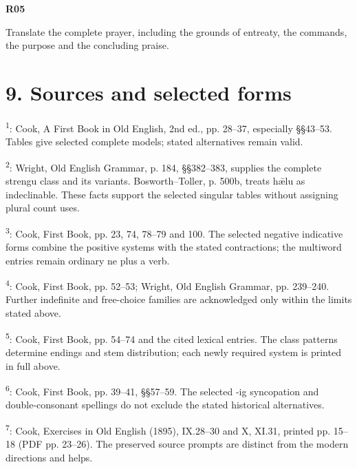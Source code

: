 \par\begin{minipage}{\linewidth}\raggedright
\textbf{R05}

Translate the complete prayer, including the grounds of entreaty, the commands, the purpose and the concluding praise.

\end{minipage}\par\addvspace{4pt}

\section*{9. Sources and selected forms}

\begingroup\fontsize{10}{12.8}\selectfont
\setlength{\parskip}{1.5pt}
\textsuperscript{1}: Cook, A First Book in Old English, 2nd ed., pp. 28–37, especially §§43–53. Tables give selected complete models; stated alternatives remain valid.

\textsuperscript{2}: Wright, Old English Grammar, p. 184, §§382–383, supplies the complete strengu class and its variants. Bosworth–Toller, p. 500b, treats hǣlu as indeclinable. These facts support the selected singular tables without assigning plural count uses.

\textsuperscript{3}: Cook, First Book, pp. 23, 74, 78–79 and 100. The selected negative indicative forms combine the positive systems with the stated contractions; the multiword entries remain ordinary ne plus a verb.

\textsuperscript{4}: Cook, First Book, pp. 52–53; Wright, Old English Grammar, pp. 239–240. Further indefinite and free-choice families are acknowledged only within the limits stated above.

\textsuperscript{5}: Cook, First Book, pp. 54–74 and the cited lexical entries. The class patterns determine endings and stem distribution; each newly required system is printed in full above.

\textsuperscript{6}: Cook, First Book, pp. 39–41, §§57–59. The selected -ig syncopation and double-consonant spellings do not exclude the stated historical alternatives.

\textsuperscript{7}: Cook, Exercises in Old English (1895), IX.28–30 and X, XI.31, printed pp. 15–18 (PDF pp. 23–26). The preserved source prompts are distinct from the modern directions and helps.

\endgroup

